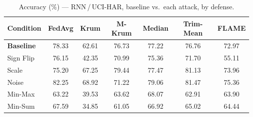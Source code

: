 \begin{table}[t]
\centering
\caption{Accuracy (\%) --- RNN\,/\,UCI-HAR, baseline vs.\ each attack, by defense.}
\label{tab:rnn_accuracy}
\footnotesize
\begin{tabular}{lcccccc}
\toprule
Condition & FedAvg & Krum & M-Krum & Median & Trim-Mean & FLAME \\
\midrule
\textbf{Baseline} & 78.33 & 62.61 & 76.73 & 77.22 & 76.76 & 72.97 \\
\midrule
Sign Flip & 76.15 & 42.35 & 70.99 & 75.36 & 71.70 & 55.11 \\
Scale & 75.20 & 67.25 & 79.44 & 77.47 & 81.13 & 73.96 \\
Noise & 82.25 & 68.92 & 71.22 & 79.06 & 81.47 & 75.36 \\
Min-Max & 63.22 & 39.53 & 63.62 & 68.07 & 62.91 & 63.90 \\
Min-Sum & 67.59 & 34.85 & 61.05 & 66.92 & 65.02 & 64.44 \\
\bottomrule
\end{tabular}
\end{table}
